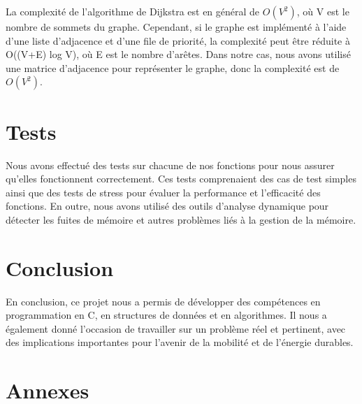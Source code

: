 \documentclass[french,a4paper]{article}
\begin{document}
La complexité de l'algorithme de Dijkstra est en général de $O(V^2)$, où V est le nombre de sommets du graphe. Cependant, si le graphe est implémenté à l'aide d'une liste d'adjacence et d'une file de priorité, la complexité peut être réduite à O((V+E) log V), où E est le nombre d'arêtes. Dans notre cas, nous avons utilisé une matrice d'adjacence pour représenter le graphe, donc la complexité est de $O(V^2)$.

\section{Tests}

Nous avons effectué des tests sur chacune de nos fonctions pour nous assurer qu'elles fonctionnent correctement. Ces tests comprenaient des cas de test simples ainsi que des tests de stress pour évaluer la performance et l'efficacité des fonctions. En outre, nous avons utilisé des outils d'analyse dynamique pour détecter les fuites de mémoire et autres problèmes liés à la gestion de la mémoire.

\section{Conclusion}

En conclusion, ce projet nous a permis de développer des compétences en programmation en C, en structures de données et en algorithmes. Il nous a également donné l'occasion de travailler sur un problème réel et pertinent, avec des implications importantes pour l'avenir de la mobilité et de l'énergie durables.

\section{Annexes}





\end{document}
